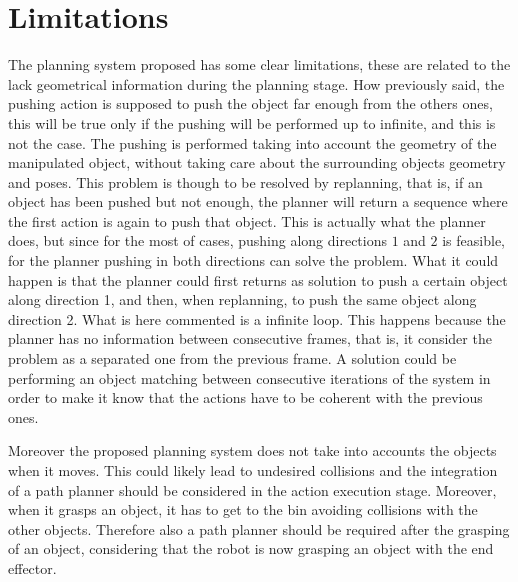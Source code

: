 \section*{Limitations}
The planning system proposed has some clear limitations, these are related to the lack geometrical information during the planning stage. 
How previously said, the pushing action is supposed to push the object far enough from the others ones, this will be true only if the pushing will be performed up to infinite, and this is not the case. The pushing is performed taking into account the geometry of the manipulated object, without taking care about the surrounding objects geometry and poses. This problem is though to be resolved by replanning, that is, if an object has been pushed but not enough, the planner will return a sequence where the first action is again to push that object. This is actually what the planner does, but since for the most of cases, pushing along directions $1$ and $2$ is feasible, for the planner pushing in both directions can solve the problem. What it could happen is that the planner could first returns as solution to push a certain object along direction 1, and then, when replanning, to push the same object along direction 2. What is here commented is a infinite loop. This happens because the planner has no information between consecutive frames, that is, it consider the problem as a separated one from the previous frame. 
A solution could be performing an object matching between consecutive iterations of the system in order to make it know that the actions have to be coherent with the previous ones. 

Moreover the proposed planning system does not take into accounts the objects when it moves. This could likely lead to undesired collisions and the integration of a path planner should be considered in the action execution stage. Moreover, when it grasps an object, it has to get to the bin avoiding collisions with the other objects. Therefore also a path planner should be required after the grasping of an object, considering that the robot is now grasping an object with the end effector.

